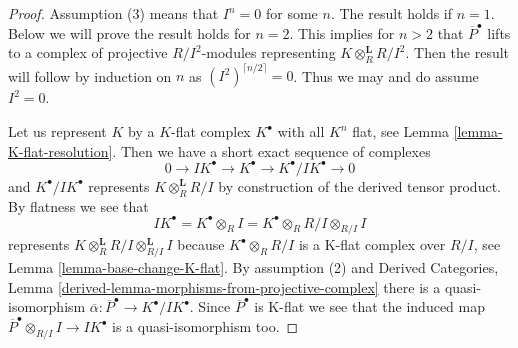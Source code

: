 \begin{proof}
Assumption (3) means that $I^n = 0$ for some $n$. The result holds if $n = 1$.
Below we will prove the result holds for $n = 2$. This implies for $n > 2$
that $\overline{P}^\bullet$ lifts to a complex of projective $R/I^2$-modules
representing $K \otimes_R^\mathbf{L} R/I^2$. Then the result will follow
by induction on $n$ as $(I^2)^{\lceil n/2 \rceil} = 0$.
Thus we may and do assume $I^2 = 0$.

\medskip\noindent
Let us represent $K$ by a $K$-flat complex $K^\bullet$ with all $K^n$
flat, see Lemma \ref{lemma-K-flat-resolution}. Then we have a short
exact sequence of complexes
$$
0 \to
IK^\bullet \to
K^\bullet \to
K^\bullet/IK^\bullet \to 0
$$
and $K^\bullet/IK^\bullet$ represents $K \otimes^\mathbf{L}_R R/I$
by construction of the derived tensor product. By flatness we see that
$$
IK^\bullet = K^\bullet \otimes_R I = K^\bullet \otimes_R R/I \otimes_{R/I} I
$$
represents $K \otimes^\mathbf{L}_R R/I \otimes^\mathbf{L}_{R/I} I$
because $K^\bullet \otimes_R R/I$ is a K-flat complex over $R/I$, see
Lemma \ref{lemma-base-change-K-flat}. By assumption (2) and
Derived Categories, Lemma \ref{derived-lemma-morphisms-from-projective-complex}
there is a quasi-isomorphism
$\overline{\alpha} : \overline{P}^\bullet \to K^\bullet/IK^\bullet$.
Since $\overline{P}^\bullet$ is K-flat we see that the induced map
$\overline{P}^\bullet \otimes_{R/I} I \to IK^\bullet$
is a quasi-isomorphism too.


\end{proof}
